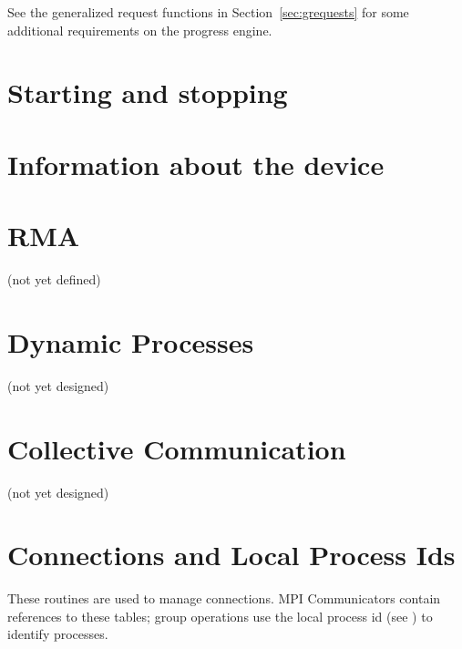 \documentclass{article}
\begin{document}
See the generalized request functions in Section~\ref{sec:grequests}
for some additional requirements on the progress engine.







\section{Starting and stopping}




\section{Information about the device}


\section{RMA}
(not yet defined)
%
%
%
%
%
%
%
%
%

\section{Dynamic Processes}
(not yet designed)

\section{Collective Communication}
(not yet designed)

\section{Connections and Local Process Ids}
\label{sec:connections}
These routines are used to manage connections.  MPI Communicators contain
references to these tables; group operations use the local process id
(see ) to identify processes.







\end{document}
